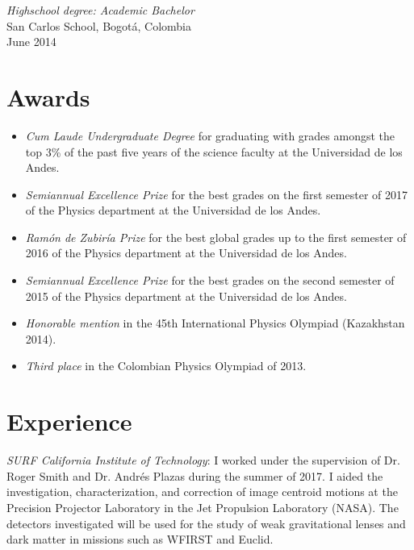 \documentclass[line,margin]{res}
\begin{document}
\begin{resume}
{\sl Highschool degree: Academic Bachelor} \\
San Carlos School, Bogotá, Colombia \\
June 2014

\section{Awards}

\begin{itemize}

\item {\sl Cum Laude Undergraduate Degree} for graduating with grades amongst the top 3\% of the past five years of the science faculty at the Universidad de los Andes.  

\item {\sl Semiannual Excellence Prize} for the best grades on the first semester of 2017 of the Physics department at the Universidad de los Andes.

\item {\sl Ramón de Zubiría Prize} for the best global grades up to the first semester of 2016 of the Physics department at the Universidad de los Andes.

\item {\sl Semiannual Excellence Prize} for the best grades on the second semester of 2015 of the Physics department at the Universidad de los Andes.

\item {\sl Honorable mention} in the 45th International Physics Olympiad (Kazakhstan 2014).

\item {\sl Third place} in the Colombian Physics Olympiad of 2013.

\end{itemize}

\section{Experience}

{\sl SURF California Institute of Technology}: I worked under the supervision of Dr. Roger Smith and Dr. Andrés Plazas during the summer of 2017. I aided the investigation, characterization, and correction of image centroid motions at the Precision Projector Laboratory in the Jet Propulsion Laboratory (NASA). The detectors investigated will be used for the study of weak gravitational lenses and dark matter in missions such as WFIRST and Euclid.


\end{resume}
\end{document}
